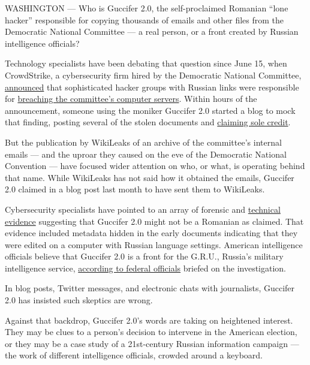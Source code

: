 WASHINGTON --- Who is Guccifer 2.0, the self-proclaimed Romanian ``lone
hacker'' responsible for copying thousands of emails and other files
from the Democratic National Committee --- a real person, or a front
created by Russian intelligence officials?

Technology specialists have been debating that question since June 15,
when CrowdStrike, a cybersecurity firm hired by the Democratic National
Committee,
\href{https://www.crowdstrike.com/blog/bears-midst-intrusion-democratic-national-committee/}{announced}
that sophisticated hacker groups with Russian links were responsible for
\href{http://www.nytimes.com/2016/06/15/us/politics/russian-hackers-dnc-trump.html}{breaching
the committee's computer servers}. Within hours of the announcement,
someone using the moniker Guccifer 2.0 started a blog to mock that
finding, posting several of the stolen documents and
\href{https://guccifer2.wordpress.com/2016/06/15/dnc/}{claiming sole
credit}.

But the publication by WikiLeaks of an archive of the committee's
internal emails --- and the uproar they caused on the eve of the
Democratic National Convention --- have focused wider attention on who,
or what, is operating behind that name. While WikiLeaks has not said how
it obtained the emails, Guccifer 2.0 claimed in a blog post last month
to have sent them to WikiLeaks.

Cybersecurity specialists have pointed to an array of forensic and
\href{http://www.nytimes.com/2016/07/27/world/europe/russia-dnc-hack-emails.html?_r=0}{technical
evidence} suggesting that Guccifer 2.0 might not be a Romanian as
claimed. That evidence included metadata hidden in the early documents
indicating that they were edited on a computer with Russian language
settings. American intelligence officials believe that Guccifer 2.0 is a
front for the G.R.U., Russia's military intelligence service,
\href{http://www.nytimes.com/2016/07/27/us/politics/spy-agency-consensus-grows-that-russia-hacked-dnc.html?ref=topics}{according
to federal officials} briefed on the investigation.

In blog posts, Twitter messages, and electronic chats with journalists,
Guccifer 2.0 has insisted such skeptics are wrong.

Against that backdrop, Guccifer 2.0's words are taking on heightened
interest. They may be clues to a person's decision to intervene in the
American election, or they may be a case study of a 21st-century Russian
information campaign --- the work of different intelligence officials,
crowded around a keyboard.

